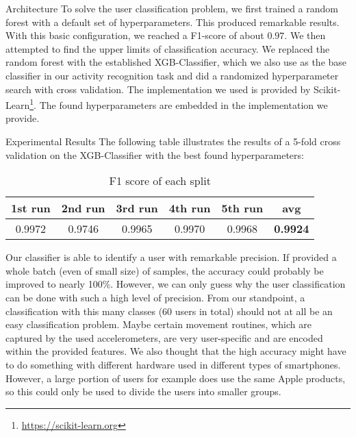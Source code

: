 \begin{subsection}{Architecture}
	To solve the user classification problem, we first trained a random forest with a default set of hyperparameters. This produced remarkable results. With this basic configuration, we reached a F1-score of about $0.97$. We then attempted to find the upper limits of classification accuracy. We replaced the random forest with the established XGB-Classifier, which we also use as the base classifier in our activity recognition task and did a randomized hyperparameter search with cross validation. The implementation we used is provided by Scikit-Learn\footnote{\href{https://scikit-learn.org/stable/}{https://scikit-learn.org}}. The found hyperparameters are embedded in the implementation we provide.

\end{subsection}

\begin{subsection}{Experimental Results}
	The following table illustrates the results of a 5-fold cross validation on the XGB-Classifier with the best found hyperparameters:
	\begin{table}[H]
		\begin{center}
			\caption{F1 score of each split}
			\begin{tabular}{ c|c|c|c|c|c  }
				\toprule
				1st run &2nd run &3rd run& 4th run & 5th run & avg\\
				\midrule
				0.9972&0.9746&0.9965&0.9970&0.9968&\textbf{0.9924}\\
				\bottomrule
			\end{tabular}
		\end{center}
	\end{table}

	Our classifier is able to identify a user with remarkable precision. If provided a whole batch (even of small size) of samples, the accuracy could probably be improved to nearly 100\%. However, we can only guess why the user classification can be done with such a high level of precision. From our standpoint, a classification with this many classes (60 users in total) should not at all be an easy classification problem. Maybe certain movement routines, which are captured by the used accelerometers, are very user-specific and are encoded within the provided features. We also thought that the high accuracy might have to do something with different hardware used in different types of smartphones. However, a large portion of users for example does use the same Apple products, so this could only be used to divide the users into smaller groups. 
\end{subsection}
